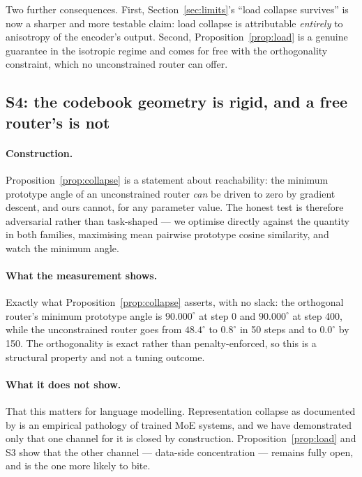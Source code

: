 Two further consequences. First, Section~\ref{sec:limits}'s ``load collapse survives'' is now a sharper and more testable claim: load collapse is attributable \emph{entirely} to anisotropy of the encoder's output. Second, Proposition~\ref{prop:load} is a genuine guarantee in the isotropic regime and comes for free with the orthogonality constraint, which no unconstrained router can offer.

\subsection{S4: the codebook geometry is rigid, and a free router's is not}
\label{sec:s4}

\paragraph{Construction.} Proposition~\ref{prop:collapse} is a statement about reachability: the minimum prototype angle of an unconstrained router \emph{can} be driven to zero by gradient descent, and ours cannot, for any parameter value. The honest test is therefore adversarial rather than task-shaped --- we optimise directly against the quantity in both families, maximising mean pairwise prototype cosine similarity, and watch the minimum angle.

\begin{table}[h]
\centering
\small

\caption{Minimum angle between distinct, non-antipodal bucket prototypes (degrees) under an objective that explicitly rewards collapse ($\dc=16$, $B=32$). The orthogonal router is unmoved at every step; the unconstrained router collapses completely within 150 steps.}
\label{tab:s4}
\end{table}

\paragraph{What the measurement shows.} Exactly what Proposition~\ref{prop:collapse} asserts, with no slack: the orthogonal router's minimum prototype angle is $90.000^\circ$ at step 0 and $90.000^\circ$ at step 400, while the unconstrained router goes from $48.4^\circ$ to $0.8^\circ$ in 50 steps and to $0.0^\circ$ by 150. The orthogonality is exact rather than penalty-enforced, so this is a structural property and not a tuning outcome.

\paragraph{What it does not show.} That this matters for language modelling. Representation collapse as documented by \citet{chi2022representation} is an empirical pathology of trained MoE systems, and we have demonstrated only that one channel for it is closed by construction. Proposition~\ref{prop:load} and S3 show that the other channel --- data-side concentration --- remains fully open, and is the one more likely to bite.

